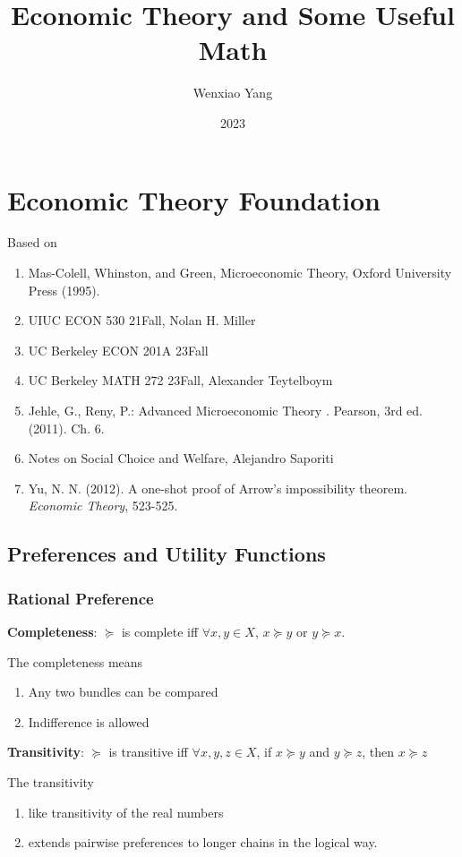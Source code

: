 \documentclass[11pt]{elegantbook}
\title{\textbf{Economic Theory and Some Useful Math}}
\author{Wenxiao Yang}
\institute{Haas School of Business, University of California Berkeley}
\date{2023}
\begin{document}
\maketitle
\frontmatter
\tableofcontents
\mainmatter



\chapter{Economic Theory Foundation}
Based on
\begin{enumerate}[$\circ$]
    \item Mas-Colell, Whinston, and Green, Microeconomic Theory, Oxford University Press (1995).
    \item UIUC ECON 530 21Fall, Nolan H. Miller
    \item UC Berkeley ECON 201A 23Fall
    \item UC Berkeley MATH 272 23Fall, Alexander Teytelboym
    \item  Jehle, G., Reny, P.: Advanced Microeconomic Theory . Pearson, 3rd ed. (2011). Ch. 6.
    \item Notes on Social Choice and Welfare, Alejandro Saporiti
    \item Yu, N. N. (2012). A one-shot proof of Arrow's impossibility theorem. \textit{Economic Theory}, 523-525.
\end{enumerate}
\section{Preferences and Utility Functions}

\subsection{Rational Preference}
\begin{definition}
    \normalfont
    \textbf{Completeness}: $\succeq$ is complete iff $\forall x,y\in X$, $x \succeq y$ or $y \succeq x$.
\end{definition}
The completeness means
\begin{enumerate}[-]
    \item Any two bundles can be compared
    \item Indifference is allowed
\end{enumerate}

\begin{definition}
    \normalfont
    \textbf{Transitivity}: $\succeq$ is transitive iff $\forall x, y, z \in X$, if $x \succeq y$ and $y \succeq z$, then $x \succeq z$
\end{definition}
The transitivity
\begin{enumerate}[-]
    \item like transitivity of the real numbers
    \item extends pairwise preferences to longer chains in the logical way.
\end{enumerate}
\end{document}

